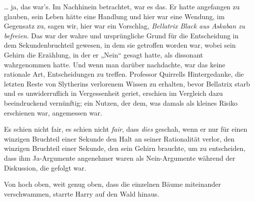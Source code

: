 … ja, das war’s. Im Nachhinein betrachtet, war es das. Er hatte angefangen zu glauben, sein Leben hätte eine Handlung und hier war eine Wendung, im Gegensatz zu, sagen wir, hier war ein Vorschlag, \emph{Bellatrix Black aus Askaban zu befreien}. Das war der wahre und ursprüngliche Grund für die Entscheidung in dem Sekundenbruchteil gewesen, in dem sie getroffen worden war, wobei sein Gehirn die Erzählung, in der er
„Nein“ gesagt hatte, als dissonant wahrgenommen hatte. Und wenn man darüber nachdachte, war das keine rationale Art, Entscheidungen zu treffen. Professor Quirrells Hintergedanke, die letzten Reste von Slytherins verlorenem Wissen zu erhalten, bevor Bellatrix starb und es unwiderruflich in Vergessenheit geriet, erschien im Vergleich dazu beeindruckend vernünftig; ein Nutzen, der dem, was damals als kleines Risiko erschienen war, angemessen war.

Es schien nicht fair, es schien nicht \emph{fair}, dass \emph{dies} geschah, wenn er nur für einen winzigen Bruchteil einer Sekunde den Halt an seiner Rationalität verlor, den winzigen Bruchteil einer Sekunde, den sein Gehirn brauchte, um zu entscheiden, dass ihm Ja-Argumente angenehmer waren als Nein-Argumente während der Diskussion, die gefolgt war.

Von hoch oben, weit genug oben, dass die einzelnen Bäume miteinander verschwammen, starrte Harry auf den Wald hinaus.

